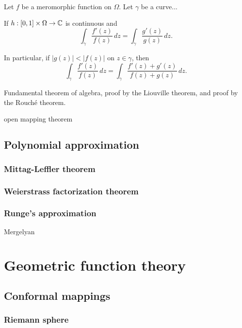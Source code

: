 \documentclass{../note}
\begin{document}
\begin{prb}
Let $f$ be a meromorphic function on $\Omega$.
Let $\gamma$ be a curve...
\begin{parts}
\item
If $h:[0,1]\times\Omega\to\mathbb{C}$ is continuous and 
\[\int_\gamma\frac{f'(z)}{f(z)}\,dz=\int_\gamma\frac{g'(z)}{g(z)}\,dz.\]
\item
In particular, if $|g(z)|<|f(z)|$ on $z\in\gamma$, then
\[\int_\gamma\frac{f'(z)}{f(z)}\,dz=\int_\gamma\frac{f'(z)+g'(z)}{f(z)+g(z)}\,dz.\]
\end{parts}
\end{prb}


\begin{prb}
Fundamental theorem of algebra, proof by the Liouville theorem, and proof by the Rouch\'e theorem.
\end{prb}

open mapping theorem








\chapter{Polynomial approximation}
\section{Mittag-Leffler theorem}
\section{Weierstrass factorization theorem}
\section{Runge's approximation}
Mergelyan









\part{Geometric function theory}

\chapter{Conformal mappings}
\section{Riemann sphere}
\end{document}

